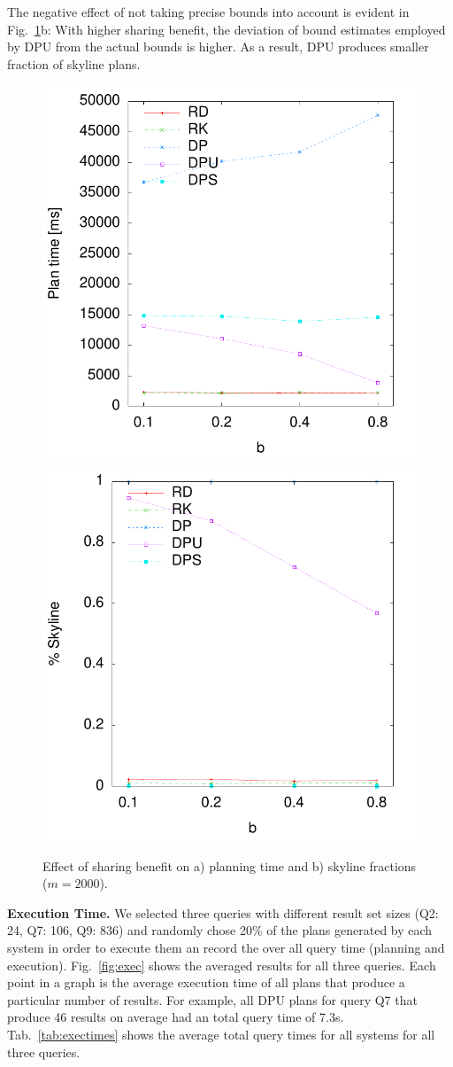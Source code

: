The negative effect of not taking precise bounds into account is evident in Fig.~\ref{fig:pareto_sharing}b: With higher sharing benefit, the deviation of bound estimates employed by DPU from the actual bounds is higher. As a result, DPU produces smaller fraction of skyline plans. 


\begin{figure}[htb]
  \centering
  \includegraphics[width=0.49\linewidth]{figs/pareto_plan_b.pdf}
  \includegraphics[width=0.49\linewidth]{figs/plans_skyline_by_b.pdf}
  \caption{Effect of sharing benefit on a) planning time and b)
    skyline fractions ($m=2000$).}
  \label{fig:pareto_sharing}
\end{figure}


\textbf{Execution Time.} We selected three queries with different
result set sizes (Q2: 24, Q7: 106, Q9: 836) and randomly chose 20\% of
the plans generated by each system in order to execute them an record
the over all query time (planning and execution). Fig.~\ref{fig:exec}
shows the averaged results for all three queries. Each point in a
graph is the average execution time of all plans that produce a
particular number of results. For example, all DPU plans for query Q7
that produce 46 results on average had an total query time of
7.3s. Tab.~\ref{tab:exectimes} shows the average total query times for
all systems for all three queries.

